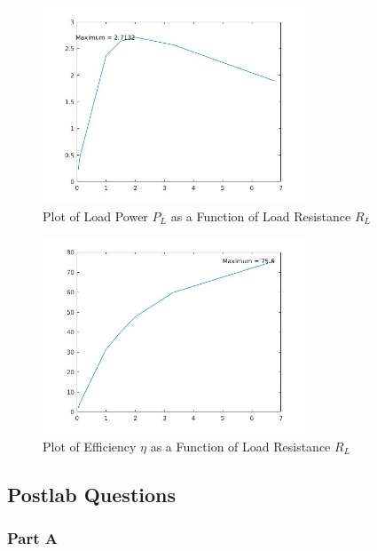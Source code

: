 \documentclass{article}
\begin{document}
    \begin{figure}[!ht]
  \centering
  \caption{Plot of Load Power $P_L$ as a Function of Load Resistance $R_L$\label{fig:resultLoadpower}}
  \includegraphics[width=0.7\textwidth]{img/plotd.jpg}
  \end{figure}

    \begin{figure}[!ht]
  \centering
  \caption{Plot of Efficiency $\eta$ as a Function of Load Resistance $R_L$\label{fig:resultLoadeff}}
  \includegraphics[width=0.7\textwidth]{img/plote.jpg}
  \end{figure}



\clearpage

\subsection{Postlab Questions}
\label{sub:Postlab Questions}

\subsubsection{Part A}
\end{document}
